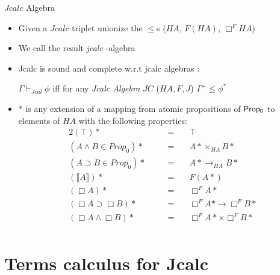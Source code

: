 \documentclass{beamer}
\begin{document}
\begin{frame}{$Jcalc$ Algebra}
  \begin{itemize}
  \item Given a $Jcalc$ triplet unionize the $\le$s ($HA$, $F(HA)$, $\Box^{F}HA$)
  \item We call the result  \textit{jcalc} -algebra
  \item Jcalc is sound and complete w.r.t jcalc algebras :
  
    $\Gamma\vdash_{Jcal}\phi$ iff for any \textit{Jcalc Algebra}  $JC$ ($HA,F,J$)
    $\Gamma^+\leq\phi^{*}$ 
  \item $*$ is any extension of a mapping from atomic propositions of ${\sf Prop_0}$
  to elements of $HA$ with the following properties:
  \begin{alignat*}{2}
    (\top)* &&\quad= & \quad\top\\
    (A\wedge B \in Prop_0)*  &&\quad = & \quad  A*\times_{HA}B*\\
    (A\supset B \in Prop_0)*  &&\quad = & \quad A*\rightarrow_{HA} B*\\
    (\llbracket A\rrbracket)* && \quad = & \quad F(A*)\\					
    (\Box A)* &&\quad = & \quad\Box^F A* \\
    (\Box A\supset \Box B)*  &&\quad = & \quad\Box^F A* \rightarrow{\Box^F B*}\\
    (\Box A\wedge\Box B)*  &&\quad = & \quad\Box^F A*\times{\Box^F B*}\\
  \end{alignat*}

  \end{itemize}

\end{frame}

\section{Terms calculus for Jcalc}
\end{document}
